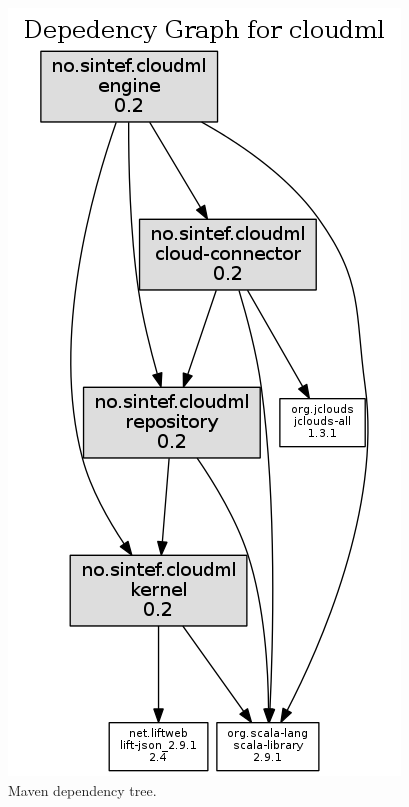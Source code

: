\begin{figure}
  \includegraphics[width=\linewidth]{img/dependency-tree.png}
  \caption{Maven dependency tree.}
  \label{fig:dependendy-tree}
\end{figure}
